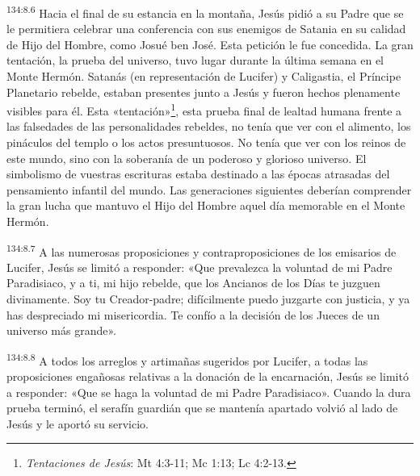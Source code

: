 \par
\textsuperscript{134:8.6} Hacia el final de su estancia en la montaña, Jesús pidió a su Padre que se le permitiera celebrar una conferencia con sus enemigos de Satania en su calidad de Hijo del Hombre, como Josué ben José. Esta petición le fue concedida. La gran tentación, la prueba del universo, tuvo lugar durante la última semana en el Monte Hermón. Satanás (en representación de Lucifer) y Caligastia, el Príncipe Planetario rebelde, estaban presentes junto a Jesús y fueron hechos plenamente visibles para él. Esta «tentación»\footnote{\textit{Tentaciones de Jesús}: Mt 4:3-11; Mc 1:13; Lc 4:2-13.}, esta prueba final de lealtad humana frente a las falsedades de las personalidades rebeldes, no tenía que ver con el alimento, los pináculos del templo o los actos presuntuosos. No tenía que ver con los reinos de este mundo, sino con la soberanía de un poderoso y glorioso universo. El simbolismo de vuestras escrituras estaba destinado a las épocas atrasadas del pensamiento infantil del mundo. Las generaciones siguientes deberían comprender la gran lucha que mantuvo el Hijo del Hombre aquel día memorable en el Monte Hermón.

\par
\textsuperscript{134:8.7} A las numerosas proposiciones y contraproposiciones de los emisarios de Lucifer, Jesús se limitó a responder: «Que prevalezca la voluntad de mi Padre Paradisiaco, y a ti, mi hijo rebelde, que los Ancianos de los Días te juzguen divinamente. Soy tu Creador-padre; difícilmente puedo juzgarte con justicia, y ya has despreciado mi misericordia. Te confío a la decisión de los Jueces de un universo más grande».

\par
\textsuperscript{134:8.8} A todos los arreglos y artimañas sugeridos por Lucifer, a todas las proposiciones engañosas relativas a la donación de la encarnación, Jesús se limitó a responder: «Que se haga la voluntad de mi Padre Paradisiaco». Cuando la dura prueba terminó, el serafín guardián que se mantenía apartado volvió al lado de Jesús y le aportó su servicio.

